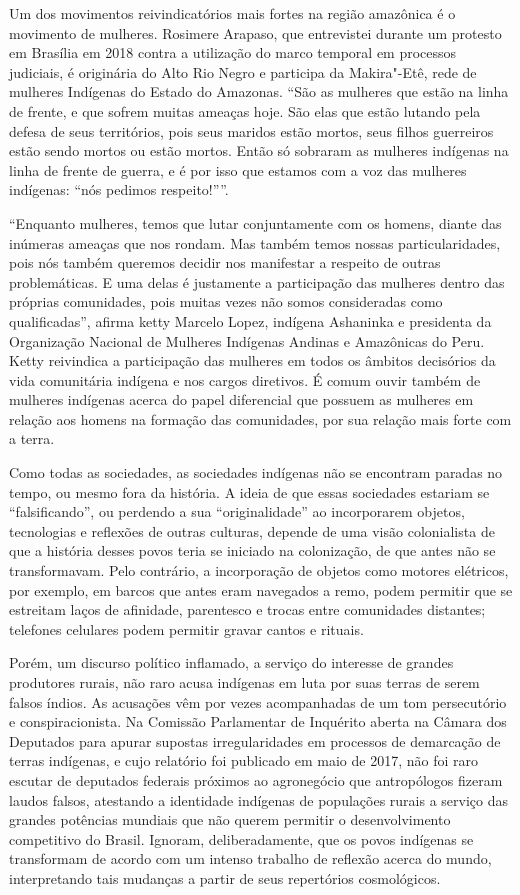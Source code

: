 Um dos movimentos reivindicatórios mais fortes na região amazônica é o
movimento de mulheres. Rosimere Arapaso, que entrevistei durante um
protesto em Brasília em 2018 contra a utilização do marco temporal em
processos judiciais, é originária do Alto Rio Negro e participa da
Makira"-Etê, rede de mulheres Indígenas do Estado do Amazonas. ``São as
mulheres que estão na linha de frente, e que sofrem muitas ameaças hoje.
São elas que estão lutando pela defesa de seus territórios, pois seus
maridos estão mortos, seus filhos guerreiros estão sendo mortos ou estão
mortos. Então só sobraram as mulheres indígenas na linha de frente de
guerra, e é por isso que estamos com a voz das mulheres indígenas: ``nós
pedimos respeito!''''.

``Enquanto mulheres, temos que lutar conjuntamente com os homens, diante
das inúmeras ameaças que nos rondam. Mas também temos nossas
particularidades, pois nós também queremos decidir nos manifestar a
respeito de outras problemáticas. E uma delas é justamente a
participação das mulheres dentro das próprias comunidades, pois muitas
vezes não somos consideradas como qualificadas'', afirma ketty Marcelo
Lopez, indígena Ashaninka e presidenta da Organização Nacional de
Mulheres Indígenas Andinas e Amazônicas do Peru. Ketty reivindica a
participação das mulheres em todos os âmbitos decisórios da vida
comunitária indígena e nos cargos diretivos. É comum ouvir também de
mulheres indígenas acerca do papel diferencial que possuem as mulheres
em relação aos homens na formação das comunidades, por sua relação mais
forte com a terra.

Como todas as sociedades, as sociedades indígenas não se encontram
paradas no tempo, ou mesmo fora da história. A ideia de que essas
sociedades estariam se ``falsificando'', ou perdendo a sua
``originalidade'' ao incorporarem objetos, tecnologias e reflexões de
outras culturas, depende de uma visão colonialista de que a história
desses povos teria se iniciado na colonização, de que antes não se
transformavam. Pelo contrário, a incorporação de objetos como motores
elétricos, por exemplo, em barcos que antes eram navegados a remo, podem
permitir que se estreitam laços de afinidade, parentesco e trocas entre
comunidades distantes; telefones celulares podem permitir gravar cantos
e rituais.

Porém, um discurso político inflamado, a serviço do interesse de grandes
produtores rurais, não raro acusa indígenas em luta por suas terras de
serem falsos índios. As acusações vêm por vezes acompanhadas de um tom
persecutório e conspiracionista. Na Comissão Parlamentar de Inquérito
aberta na Câmara dos Deputados para apurar supostas irregularidades em
processos de demarcação de terras indígenas, e cujo relatório foi
publicado em maio de 2017, não foi raro escutar de deputados federais
próximos ao agronegócio que antropólogos fizeram laudos falsos,
atestando a identidade indígenas de populações rurais a serviço das
grandes potências mundiais que não querem permitir o desenvolvimento
competitivo do Brasil. Ignoram, deliberadamente, que os povos indígenas
se transformam de acordo com um intenso trabalho de reflexão acerca do
mundo, interpretando tais mudanças a partir de seus repertórios
cosmológicos.


